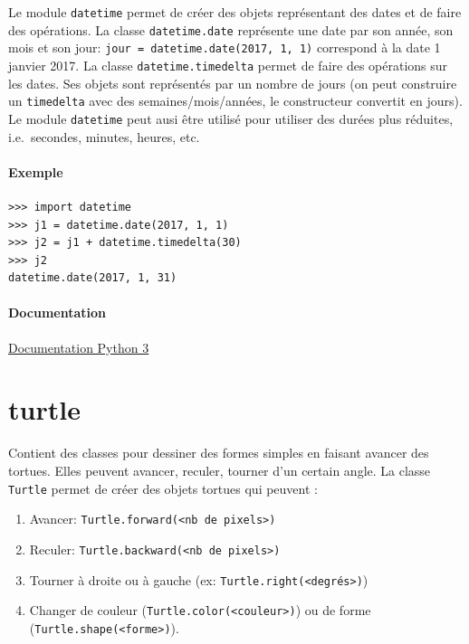 \documentclass[a4paper, 10pt]{article}
\newcommand{\code}[1]{{\small\texttt{#1}}}
\begin{document}
Le module \code{datetime}\marginpar{\code{datetime}} permet de créer des objets représentant des dates et de faire des opérations. La classe \code{datetime.date} représente une date par son année, son mois et son jour: \code{jour = datetime.date(2017, 1, 1)} correspond à la date 1\ier{} janvier 2017.
La classe \code{datetime.timedelta} permet de faire des opérations sur les dates. Ses objets sont représentés par un nombre de jours (on peut construire un \code{timedelta} avec des semaines/mois/années, le constructeur convertit en jours).
Le module \code{datetime} peut ausi être utilisé pour utiliser des durées plus réduites, i.e.\ secondes, minutes, heures, etc.

\paragraph{Exemple}
\begin{Verbatim}[fontsize = \footnotesize, frame = single]
>>> import datetime
>>> j1 = datetime.date(2017, 1, 1)
>>> j2 = j1 + datetime.timedelta(30)
>>> j2
datetime.date(2017, 1, 31)
\end{Verbatim}


\paragraph*{Documentation} \href{https://docs.python.org/fr/3/library/datetime.html}{Documentation Python 3}

\section{turtle}

Contient des classes pour dessiner des formes simples en faisant avancer des tortues. Elles peuvent avancer, reculer, tourner d'un certain angle.
La classe \code{Turtle} permet de créer des objets tortues qui peuvent :
\begin{enumerate}
        \item Avancer: \code{Turtle.forward(<nb de pixels>)}
        \item Reculer: \code{Turtle.backward(<nb de pixels>)}
        \item Tourner à droite ou à gauche (ex: \code{Turtle.right(<degrés>)})
        \item Changer de couleur (\code{Turtle.color(<couleur>)}) ou de forme (\code{Turtle.shape(<forme>)}).
\end{enumerate}
\end{document}
